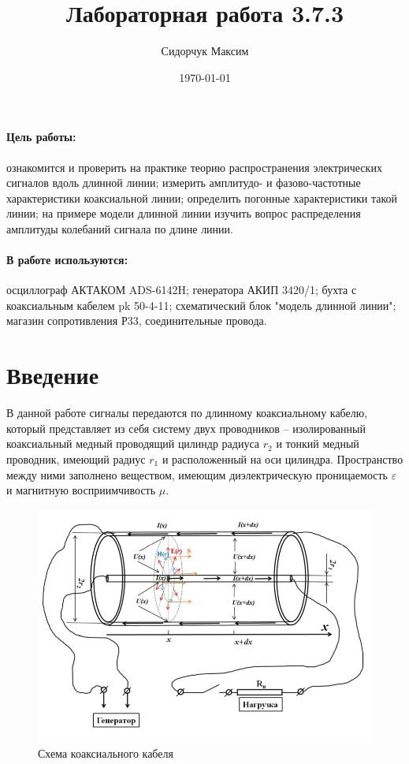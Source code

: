 \documentclass[a4paper,12pt]{article}
\author{Сидорчук Максим}
\title{Лабораторная работа 3.7.3}
\date{\today}
\theoremstyle{definition}
\begin{document}
{\Large \maketitle}

	\paragraph*{Цель работы:} ознакомится и проверить на практике теорию распространения
	электрических сигналов вдоль длинной линии; измерить амплитудо- и фазово-частотные
	характеристики коаксиальной линии; определить погонные характеристики такой
	линии; на примере модели длинной линии изучить вопрос распределения амплитуды
	колебаний сигнала по длине линии.
	\paragraph*{В работе используются:} осциллограф АКТАКОМ ADS-6142H; генератора АКИП 3420/1; бухта с коаксиальным кабелем pk 50-4-11; 
	схематический блок "модель длинной линии"; магазин сопротивления Р33, соединительные провода.

	\section{Введение}
	В данной работе сигналы передаются по длинному коаксиальному кабелю, который представляет из себя систему двух проводников -- изолированный коаксиальный медный проводящий цилиндр радиуса $r_2$ и тонкий медный проводник, имеющий радиус $r_1$ и расположенный на оси цилиндра. Пространство между ними заполнено веществом, имеющим диэлектрическую проницаемость $\varepsilon$ и магнитную восприимчивость $\mu$.
	
	\begin{figure}[h]
		\centering
		\includegraphics[scale=1]{cabel.png}
		\caption{Схема коаксиального кабеля}
	\end{figure}
	
\end{document}

